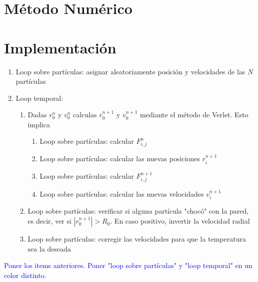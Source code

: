 \documentclass[aps,prb,twocolumn,superscriptaddress,floatfix,longbibliography]{revtex4-2}
\newif\ifptitle
\newif\ifpnumber
\newcounter{para}
\newcommand\ptitle[1]{\par\refstepcounter{para}
{\ifpnumber{\noindent\textcolor{lightgray}{\textbf{\thepara}}\indent}\fi}
{\ifptitle{\textbf{[{#1}]}}\fi}}
\begin{document}
\section{Método Numérico}

\section{Implementación}



\ptitle{¿Qué pasos debe hacer nuestro código para calcular la evolución del gas de electrones?}

\begin{enumerate}
    \item Loop sobre partículas: asignar aleatoriamente posición y velocidades de las $N$ partículas
    \item Loop temporal:
    \begin{enumerate}
        \item Dadas $r_0^n$ y $v_0^n$ calculas $r_0^{n+1}$ y $v_0^{n+1}$ mediante el método de Verlet. Esto implica
        \begin{enumerate}
            \item Loop sobre partículas: calcular $F_{i,j}^n$
            \item Loop sobre partículas: calcular las nuevas posiciones $r_{i}^{n+1}$
            \item Loop sobre partículas: calcular $F_{i,j}^{n+1}$
            \item Loop sobre partículas: calcular las nuevas velocidades $v_{i}^{n+1}$
        \end{enumerate}
        \item Loop sobre partículas: verificar si alguna partícula "chocó" con la pared, es decir, ver si $|r_0^{n+1}| > R_0$. En caso positivo, invertir la velocidad radial
        \item Loop sobre partículas: corregir las velocidades para que la temperatura sea la deseada
    \end{enumerate}
\end{enumerate}
\textcolor{blue}{Poner los items anteriores. Poner "loop sobre partículas" y "loop temporal" en un color distinto.}
\end{document}
